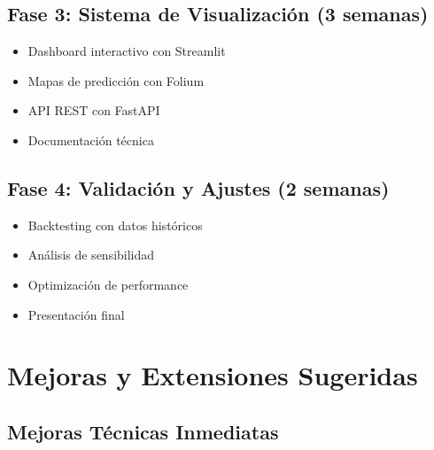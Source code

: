 \documentclass[12pt,a4paper]{article}
\begin{document}
\subsection{Fase 3: Sistema de Visualización (3 semanas)}
\begin{itemize}
    \item Dashboard interactivo con Streamlit
    \item Mapas de predicción con Folium
    \item API REST con FastAPI
    \item Documentación técnica
\end{itemize}

\subsection{Fase 4: Validación y Ajustes (2 semanas)}
\begin{itemize}
    \item Backtesting con datos históricos
    \item Análisis de sensibilidad
    \item Optimización de performance
    \item Presentación final
\end{itemize}

\section{Mejoras y Extensiones Sugeridas}

\subsection{Mejoras Técnicas Inmediatas}
\end{document}
